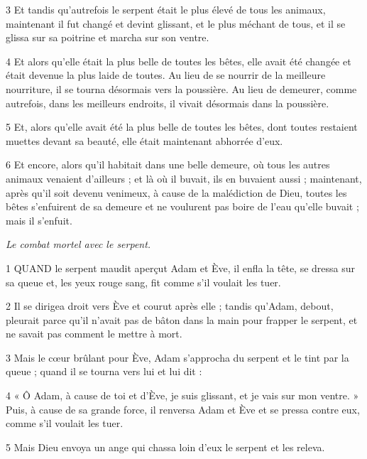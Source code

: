 \par 3 Et tandis qu'autrefois le serpent était le plus élevé de tous les animaux, maintenant il fut changé et devint glissant, et le plus méchant de tous, et il se glissa sur sa poitrine et marcha sur son ventre.

\par 4 Et alors qu'elle était la plus belle de toutes les bêtes, elle avait été changée et était devenue la plus laide de toutes. Au lieu de se nourrir de la meilleure nourriture, il se tourna désormais vers la poussière. Au lieu de demeurer, comme autrefois, dans les meilleurs endroits, il vivait désormais dans la poussière.

\par 5 Et, alors qu'elle avait été la plus belle de toutes les bêtes, dont toutes restaient muettes devant sa beauté, elle était maintenant abhorrée d'eux.

\par 6 Et encore, alors qu'il habitait dans une belle demeure, où tous les autres animaux venaient d'ailleurs ; et là où il buvait, ils en buvaient aussi ; maintenant, après qu'il soit devenu venimeux, à cause de la malédiction de Dieu, toutes les bêtes s'enfuirent de sa demeure et ne voulurent pas boire de l'eau qu'elle buvait ; mais il s'enfuit.


\par \textit{Le combat mortel avec le serpent.}

\par 1 QUAND le serpent maudit aperçut Adam et Ève, il enfla la tête, se dressa sur sa queue et, les yeux rouge sang, fit comme s'il voulait les tuer.

\par 2 Il se dirigea droit vers Ève et courut après elle ; tandis qu'Adam, debout, pleurait parce qu'il n'avait pas de bâton dans la main pour frapper le serpent, et ne savait pas comment le mettre à mort.

\par 3 Mais le cœur brûlant pour Ève, Adam s'approcha du serpent et le tint par la queue ; quand il se tourna vers lui et lui dit :

\par 4 « Ô Adam, à cause de toi et d'Ève, je suis glissant, et je vais sur mon ventre. » Puis, à cause de sa grande force, il renversa Adam et Ève et se pressa contre eux, comme s'il voulait les tuer.

\par 5 Mais Dieu envoya un ange qui chassa loin d'eux le serpent et les releva.


